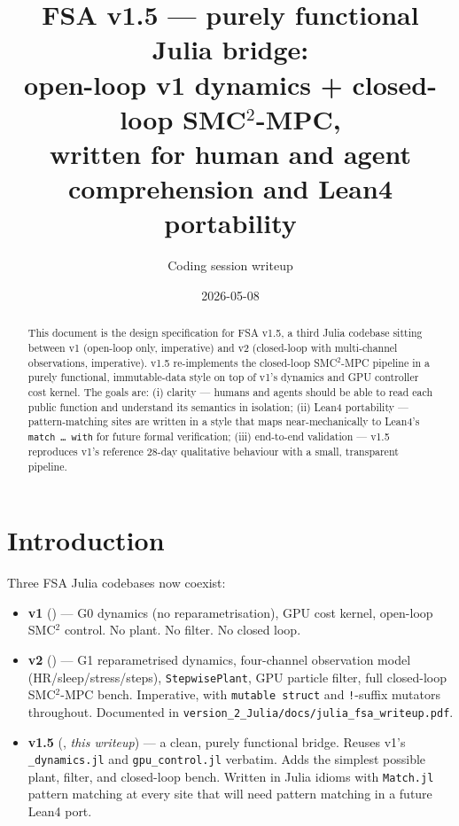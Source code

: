 \documentclass[11pt,a4paper]{article}
\title{FSA v1.5 — purely functional Julia bridge:\\
  open-loop v1 dynamics + closed-loop SMC$^2$-MPC,\\
  written for human and agent comprehension and Lean4 portability}
\author{Coding session writeup}
\date{2026-05-08}
\begin{document}
\maketitle

\begin{abstract}
\noindent
This document is the design specification for FSA v1.5, a third Julia
codebase sitting between v1 (open-loop only, imperative) and v2
(closed-loop with multi-channel observations, imperative). v1.5
re-implements the closed-loop SMC$^2$-MPC pipeline in a purely
functional, immutable-data style on top of v1's dynamics and GPU
controller cost kernel. The goals are: (i) clarity --- humans and
agents should be able to read each public function and understand its
semantics in isolation; (ii) Lean4 portability --- pattern-matching
sites are written in a style that maps near-mechanically to Lean4's
\texttt{match \dots\ with} for future formal verification; (iii)
end-to-end validation --- v1.5 reproduces v1's reference 28-day
qualitative behaviour with a small, transparent pipeline.
\end{abstract}

\tableofcontents

\bigskip

\section{Introduction}

Three FSA Julia codebases now coexist:

\begin{itemize}[itemsep=2pt,leftmargin=*]
\item \textbf{v1} () ---
  G0 dynamics (no reparametrisation), GPU cost kernel, open-loop
  SMC$^2$ control. No plant. No filter. No closed loop.
\item \textbf{v2} () ---
  G1 reparametrised dynamics, four-channel observation model
  (HR/sleep/stress/steps), \texttt{StepwisePlant}, GPU particle
  filter, full closed-loop SMC$^2$-MPC bench. Imperative, with
  \texttt{mutable struct} and \texttt{!}-suffix mutators throughout.
  Documented in \texttt{version\_2\_Julia/docs/julia\_fsa\_writeup.pdf}.
\item \textbf{v1.5} (, \emph{this writeup})
  --- a clean, purely functional bridge. Reuses v1's
  \texttt{\_dynamics.jl} and \texttt{gpu\_control.jl} verbatim. Adds
  the simplest possible plant, filter, and closed-loop bench.
  Written in Julia idioms with \texttt{Match.jl} pattern matching at
  every site that will need pattern matching in a future Lean4 port.
\end{itemize}
\end{document}
